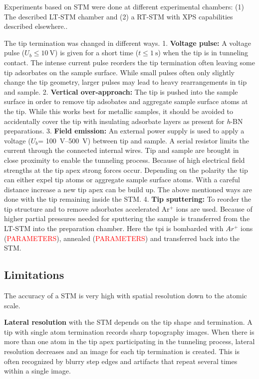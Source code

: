Experiments based on STM were done at different experimental chambers: 
(1) The described LT-STM chamber \cite{urgel_tendero_two-dimensional_2015, schwarz_assembly_2018, wiengarten_scanning_2015} and (2) a RT-STM with XPS capabilities described elsewhere.\cite{schwarz_assembly_2018}. 

The tip termination was changed in different ways. 
1. \textbf{Voltage pulse:} 
A voltage pulse ($U_b \leq \SI{10}{\volt}$) is given for a short time ($t \leq \SI{1}{\second}$) when the tip is in tunneling contact. The intense current pulse reorders the tip termination often leaving some tip adsorbates on the sample surface. While small pulses often only slightly change the tip geometry, larger pulses may lead to heavy rearrangements in tip and sample.
2. \textbf{Vertical over-approach:}
The tip is pushed into the sample surface in order to remove tip adsobates and aggregate sample surface atoms at the tip. While this works best for metallic samples, it should be avoided to accidentally cover the tip with insulating adsorbate layers as present for \textit{h}-BN preparations.
3. \textbf{Field emission:}
An external power supply is used to apply a voltage ($U_b$=
\SIrange{100}{500}{\volt}) between tip and sample. A serial resistor limits the current through the connected internal wires. Tip and sample are brought in close proximity to enable the tunneling process. Because of high electrical field strengths at the tip apex strong forces occur. Depending on the polarity the tip can either expel tip atoms or aggregate sample surface atoms. With a careful distance increase a new tip apex can be build up.
The above mentioned ways are done with the tip remaining inside the STM.
4. \textbf{Tip sputtering:}
To reorder the tip structure and to remove adsorbates accelerated Ar$^+$ ions are used. Because of higher partial pressures needed for sputtering the sample is transferred from the LT-STM into the preparation chamber. Here the tpi is bombarded with $Ar^+$ ions (\textcolor{red}{PARAMETERS}), annealed (\textcolor{red}{PARAMETERS}) and transferred back into the STM.

\subsection{Limitations}

The accuracy of a STM is very high with spatial resolution down to the atomic scale.

\textbf{Lateral resolution} with the STM depends on the tip shape and termination. A tip with single atom termination records sharp topography images. When there is more than one atom in the tip apex participating in the tunneling process, lateral resolution decreases and an image for each tip termination is created. This is often recognized by blurry step edges and artifacts that repeat several times within a single image.


